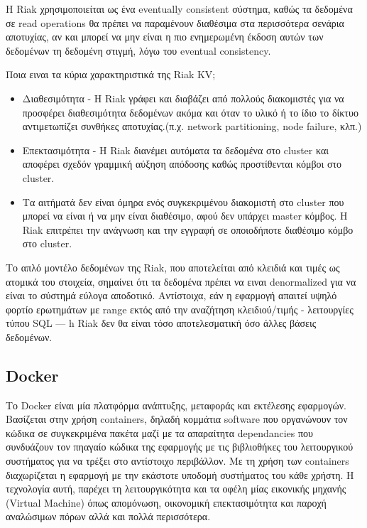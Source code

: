 \documentclass[conference]{IEEEtran}
\begin{document}
H Riak χρησιμοποιείται ως ένα eventually consistent σύστημα, καθώς τα δεδομένα σε read operations θα πρέπει να παραμένουν διαθέσιμα στα περισσότερα σενάρια αποτυχίας, αν και μπορεί να μην είναι η πιο ενημερωμένη έκδοση αυτών των δεδομένων τη δεδομένη στιγμή, λόγω του eventual consistency.

Ποια ειναι τα κύρια χαρακτηριστικά της Riak KV;
\begin{itemize}
    \item 
    Διαθεσιμότητα - H Riak γράφει και διαβάζει από πολλούς διακομιστές για να προσφέρει διαθεσιμότητα δεδομένων ακόμα και όταν το υλικό ή το ίδιο το δίκτυο αντιμετωπίζει συνθήκες αποτυχίας.(π.χ. network partitioning, node failure, κλπ.)
    
    \item 
    Επεκτασιμότητα - Η Riak διανέμει αυτόματα τα δεδομένα στο cluster και αποφέρει σχεδόν γραμμική αύξηση απόδοσης καθώς προστίθενται κόμβοι στο cluster.

    \item 
    Τα αιτήματά δεν είναι όμηρα ενός συγκεκριμένου διακομιστή στο cluster που μπορεί να είναι ή να μην είναι διαθέσιμο, αφού δεν υπάρχει master κόμβος. Η Riak επιτρέπει την ανάγνωση και την εγγραφή σε οποιοδήποτε διαθέσιμο κόμβο στο cluster.
\end{itemize}
Το απλό μοντέλο δεδομένων της Riak, που αποτελείται από κλειδιά και τιμές ως ατομικά του στοιχεία, σημαίνει ότι τα δεδομένα πρέπει να ειναι denormalized για να είναι το σύστημά εύλογα αποδοτικό. Αντίστοιχα, εάν η εφαρμογή απαιτεί υψηλό φορτίο ερωτημάτων με range εκτός από την αναζήτηση κλειδιού/τιμής - λειτουργίες τύπου SQL — h Riak δεν θα είναι τόσο αποτελεσματική όσο άλλες βάσεις δεδομένων.



\subsection{Docker}
Το Docker είναι μία πλατφόρμα ανάπτυξης, μεταφοράς και εκτέλεσης εφαρμογών. Βασίζεται στην χρήση containers, δηλαδή κομμάτια software που οργανώνουν τον κώδικα σε συγκεκριμένα πακέτα μαζί με τα απαραίτητα dependancies που συνδυάζουν τον πηαγαίο κώδικα της εφαρμογής με τις βιβλιοθήκες του λειτουργικού συστήματος για να τρέξει στο αντίστοιχο περιβάλλον.  Με τη χρήση των containers διαχωρίζεται η εφαρμογή με την εκάστοτε υποδομή συστήματος του κάθε χρήστη. Η τεχνολογία αυτή, παρέχει τη λειτουργικότητα και τα οφέλη μίας εικονικής μηχανής (Virtual Machine) όπως απομόνωση, οικονομική επεκτασιμότητα και παροχή αναλώσιμων πόρων αλλά και πολλά περισσότερα.
\end{document}
